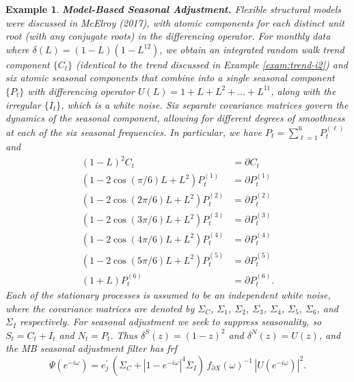 \documentclass[a4paper]{book}
\newtheorem{Example}{Example}
\begin{document}
\begin{Example} {\bf Model-Based Seasonal Adjustment.} \rm
\label{exam:sa}
  Flexible structural models were discussed in McElroy (2017), 
  with atomic components for each distinct unit root
 (with any conjugate roots) in the differencing operator.  
 For monthly data  where $\delta (L) = (1-L)(1-L^{12})$,
 we obtain an integrated random walk trend component $\{ C_t \}$ 
 (identical to the trend discussed in Example \ref{exam:trend-i2})
 and six atomic seasonal components that combine into a single 
 seasonal component $\{ P_t \}$ with differencing
 operator $U(L) = 1 + L + L^2 + \ldots + L^{11}$, along with the
 irregular $\{ I_t \}$, which is a white noise. 
  Six separate covariance matrices govern the dynamics of the seasonal
  component, allowing for different degrees of
 smoothness at each of the six seasonal frequencies. 
 In particular, we have $P_t = \sum_{\ell=1}^6 P^{(\ell)}_t$ and
\begin{align*}
  {(1-L)}^2 C_t & = \partial C_t \\
   (1 - 2 \cos (\pi/6) L + L^2) P^{(1)}_t & = \partial P^{(1)}_t \\
  (1 - 2 \cos (2\pi/6) L + L^2) P^{(2)}_t & = \partial P^{(2)}_t \\
  (1 - 2 \cos (3\pi/6) L + L^2) P^{(3)}_t & = \partial P^{(3)}_t \\
  (1 - 2 \cos (4\pi/6) L + L^2) P^{(4)}_t & = \partial P^{(4)}_t \\
  (1 - 2 \cos (5\pi/6) L + L^2) P^{(5)}_t & = \partial P^{(5)}_t \\
  (1 +L) P^{(6)}_t & = \partial P^{(6)}_t. 
 \end{align*}
 Each of the stationary processes is assumed to be an independent white noise,
 where the covariance matrices are denoted by $\Sigma_C$, $\Sigma_{1}$,
  $\Sigma_2$, $\Sigma_3$, $\Sigma_4$, $\Sigma_5$, $\Sigma_6$, and 
  $\Sigma_I$ respectively.   For seasonal adjustment we seek to suppress
  seasonality, so $S_t = C_t + I_t$ and $N_t = P_t$.  Thus $\delta^S (z) = {(1-z)}^2$
  and $\delta^N (z) = U(z)$, and the MB seasonal adjustment filter   has frf
\[
  \Psi (e^{-i \omega}) = e_j^{\prime} \, \left( \Sigma_{C} + {|1 - e^{-i \omega}|}^4
   \Sigma_I \right) \, 
    { f_{\partial X} (\omega) }^{-1} \, {| U (e^{-i \omega}) |}^2.
\]
\end{Example}
\end{document}
